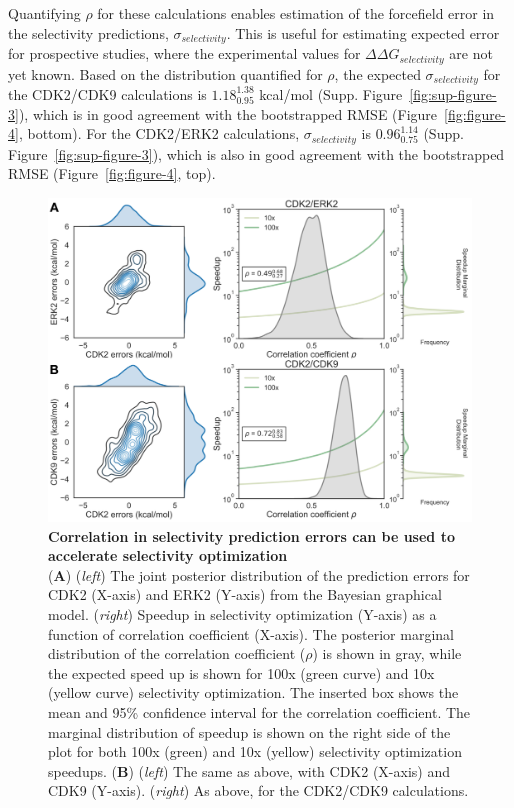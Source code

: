 \documentclass[9pt,lineno]{elife-modified} %
\begin{document}
Quantifying $\rho$ for these calculations enables estimation of the forcefield error in the selectivity predictions, $\sigma_{selectivity}$. This is useful for estimating expected error for prospective studies, where the experimental values for $\Delta \Delta G_{selectivity}$ are not yet known. Based on the distribution quantified for $\rho$, the expected $\sigma_{selectivity}$ for the CDK2/CDK9 calculations is $1.18^{1.38}_{0.95}$ kcal/mol (Supp. Figure~\ref{fig:sup-figure-3}), which is in good agreement with the bootstrapped RMSE (Figure~\ref{fig:figure-4}, bottom). For the CDK2/ERK2 calculations, $\sigma_{selectivity}$ is $0.96^{1.14}_{0.75}$ (Supp. Figure~\ref{fig:sup-figure-3}), which is also in good agreement with the bootstrapped RMSE (Figure~\ref{fig:figure-4}, top). 


\begin{figure}
\begin{fullwidth}
\begin{centering}
\includegraphics[width=1.0\linewidth]{figures/figure5.pdf}
\end{centering}
\caption{
\label{fig:figure-6}
{\bf Correlation in selectivity prediction errors can be used to accelerate selectivity optimization} \\
({\bf A}) (\emph{left}) The joint posterior distribution of the prediction errors for CDK2 (X-axis) and ERK2 (Y-axis) from the Bayesian graphical model. (\emph{right}) Speedup in selectivity optimization (Y-axis) as a function of correlation coefficient (X-axis). The posterior marginal distribution of the correlation coefficient ($\rho$) is shown in gray, while the expected speed up is shown for 100x (green curve) and 10x (yellow curve) selectivity optimization. The inserted box shows the mean and 95\% confidence interval for the correlation coefficient. The marginal distribution of speedup is shown on the right side of the plot for both 100x (green) and 10x (yellow) selectivity optimization speedups. 
({\bf B}) (\emph{left}) The same as above, with CDK2 (X-axis) and CDK9 (Y-axis). (\emph{right}) As above, for the CDK2/CDK9 calculations.}
\end{fullwidth}
\end{figure}
\end{document}
